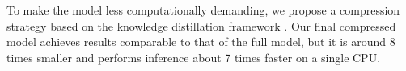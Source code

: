 To make the model less computationally demanding, we propose a compression strategy based on the knowledge distillation framework \cite{Hinton2015DistillingTK}. Our final compressed model achieves results comparable to that of the full model, but it is around 8 times smaller and performs inference about 7 times faster on a single CPU.

%
